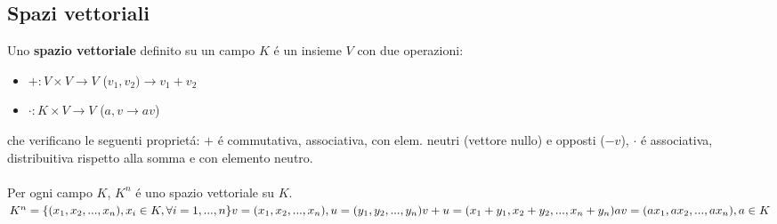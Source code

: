 \documentclass{article}
\begin{document}
\subsection{Spazi vettoriali}
Uno \textbf{spazio vettoriale} definito su un campo $K$ é un insieme $V$ con due operazioni:
\begin{itemize}
	\item[] $+ : V \times V \rightarrow V$ ($v_1, v_2) \rightarrow v_1 + v_2$
	\item[] $\cdot : K \times V \rightarrow V$ ($a, v \rightarrow av$)
\end{itemize}
che verificano le seguenti proprietá: $+$ é commutativa, associativa, con elem. neutri (vettore nullo) e opposti ($-v$), $\cdot$ é associativa, distribuitiva rispetto alla somma e con elemento neutro.\\\\
Per ogni campo $K$, $K^n$ é uno spazio vettoriale su $K$.\\
$K^n = \{(x_1, x_2, ..., x_n), x_i \in K, \forall i=1, ..., n\} \\
v = (x_1, x_2, ..., x_n), u = (y_1, y_2, ..., y_n) \\
v + u = (x_1 + y_1, x_2 + y_2, ..., x_n + y_n) \\
av = (ax_1, ax_2, ..., ax_n), a \in K
$
\end{document}
